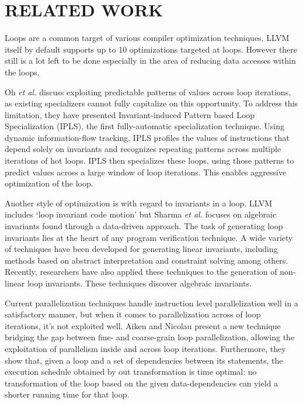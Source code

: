 \chapter{RELATED WORK} %
Loops are a common target of various compiler optimization techniques. LLVM itself by default supports up to 10 optimizations targeted at loops. However there still is a lot left to be done especially in the area of reducing data accesses within the loops.

Oh \textsl{et al.} \cite{oh2013practical} discuss exploiting predictable patterns of values across loop iterations, as existing specializers cannot fully capitalize on this opportunity. To address this limitation, they have presented Invariant-induced Pattern based Loop Specialization (IPLS), the first fully-automatic specialization technique. Using dynamic information-flow tracking, IPLS profiles the values of instructions that depend solely on invariants and recognizes repeating patterns across multiple iterations of hot loops. IPLS then specializes these loops, using those patterns to predict values across a large window of loop iterations. This enables aggressive optimization of the loop.

Another style of optimization is with regard to invariants in a loop. LLVM includes ‘loop invariant code motion’ but Sharma \textsl{et al.} \cite{sharma2013data} focuses on algebraic invariants found through a data-driven approach. The task of generating loop invariants lies at the heart of any program verification technique. A wide variety of techniques have been developed for generating linear invariants, including methods based on abstract interpretation and constraint solving among others. Recently, researchers have also applied these techniques to the generation of non-linear loop invariants. These techniques discover algebraic invariants.

	
Current parallelization techniques handle instruction level parallelization well in a satisfactory manner, but when it comes to parallelization across of loop iterations, it’s not exploited well. Aiken and Nicolau \cite{aiken1988optimal} present a new technique bridging the gap between fine- and coarse-grain loop parallelization, allowing the exploitation of parallelism inside and across loop iterations. Furthermore, they show that, given a loop and a set of dependencies between its statements, the execution schedule obtained by out transformation is time optimal: no transformation of the loop based on the given data-dependencies can yield a shorter running time for that loop.


